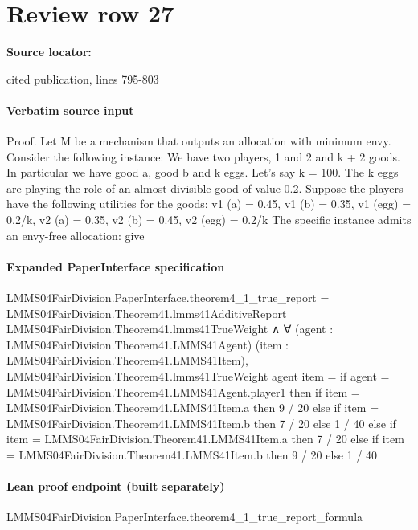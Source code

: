 \documentclass[10pt]{article}
\begin{document}
\section*{Review row 27}
\textbf{Source locator:} {\footnotesize\raggedright cited publication, lines 795-\allowbreak{}803\par}
\paragraph{Verbatim source input}
\begin{ReviewVerbatim}
Proof. Let M be a mechanism that outputs an allocation with minimum envy. Consider the following instance:
We have two players, 1 and 2 and k + 2 goods. In particular
we have good a, good b and k eggs. Let’s say k = 100. The
k eggs are playing the role of an almost divisible good of
value 0.2. Suppose the players have the following utilities
for the goods:
v1 (a) = 0.45, v1 (b) = 0.35, v1 (egg) = 0.2/k,
v2 (a) = 0.35, v2 (b) = 0.45, v2 (egg) = 0.2/k
The specific instance admits an envy-free allocation: give
\end{ReviewVerbatim}


\paragraph{Expanded PaperInterface specification}
\begin{ReviewVerbatim}
LMMS04FairDivision.PaperInterface.theorem4_1_true_report =
    LMMS04FairDivision.Theorem41.lmms41AdditiveReport LMMS04FairDivision.Theorem41.lmms41TrueWeight ∧
  ∀ (agent : LMMS04FairDivision.Theorem41.LMMS41Agent) (item : LMMS04FairDivision.Theorem41.LMMS41Item),
    LMMS04FairDivision.Theorem41.lmms41TrueWeight agent item =
      if agent = LMMS04FairDivision.Theorem41.LMMS41Agent.player1 then
        if item = LMMS04FairDivision.Theorem41.LMMS41Item.a then 9 / 20
        else if item = LMMS04FairDivision.Theorem41.LMMS41Item.b then 7 / 20 else 1 / 40
      else
        if item = LMMS04FairDivision.Theorem41.LMMS41Item.a then 7 / 20
        else if item = LMMS04FairDivision.Theorem41.LMMS41Item.b then 9 / 20 else 1 / 40
\end{ReviewVerbatim}

\paragraph{Lean proof endpoint (built separately)}\begin{ReviewVerbatim}
LMMS04FairDivision.PaperInterface.theorem4_1_true_report_formula
\end{ReviewVerbatim}
\end{document}
